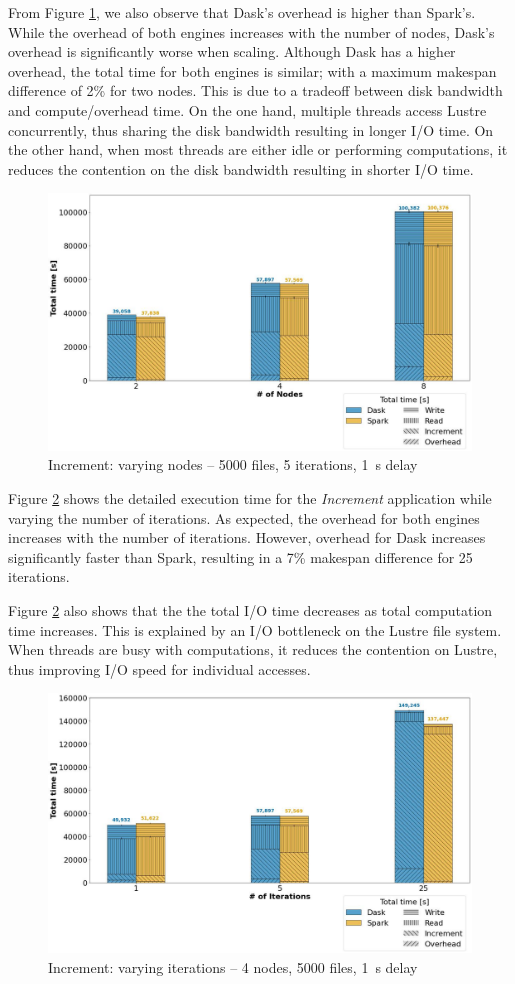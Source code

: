 \documentclass[AMA,STIX1COL]{WileyNJD-v2}
\begin{document}
From Figure \ref{fig:increment_worker}, we also observe that Dask's overhead is higher than Spark's.
While the overhead of both engines increases with the number of nodes, Dask's overhead is significantly worse when scaling.
Although Dask has a higher overhead, the total time for both engines is similar; with a maximum makespan difference of 2\% for two nodes.
This is due to a tradeoff between disk bandwidth and compute/overhead time.
On the one hand, multiple threads access Lustre concurrently, thus sharing the disk bandwidth resulting in longer I/O time.
On the other hand, when most threads are either idle or performing computations, it reduces the contention on the disk bandwidth resulting in shorter I/O time.
\begin{figure}[!h]
	\centering
	\includegraphics[clip,width=0.75\columnwidth]{figures/stacked_increment_worker.jpg}
	\caption{Increment: varying nodes -- 5000 files, 5 iterations, \SI{1}{\second} delay}
	\label{fig:increment_worker}
\end{figure}
				
Figure \ref{fig:increment_itr} shows the detailed execution time for the \textit{Increment} application while varying the number of iterations.
As expected, the overhead for both engines increases with the number of iterations.
However, overhead for Dask increases significantly faster than Spark, resulting in a 7\% makespan difference for 25 iterations.
				
Figure \ref{fig:increment_itr} also shows that the the total I/O time decreases as total computation time increases.
This is explained by an I/O bottleneck on the Lustre file system.
When threads are busy with computations, it reduces the contention on Lustre, thus improving I/O speed for individual accesses.
\begin{figure}[!h]
	\centering
	\includegraphics[clip,width=0.75\columnwidth]{figures/stacked_increment_itr.jpg}
	\caption{Increment: varying iterations -- 4 nodes, 5000 files, \SI{1}{\second} delay}
	\label{fig:increment_itr}
\end{figure}
				
\end{document}

